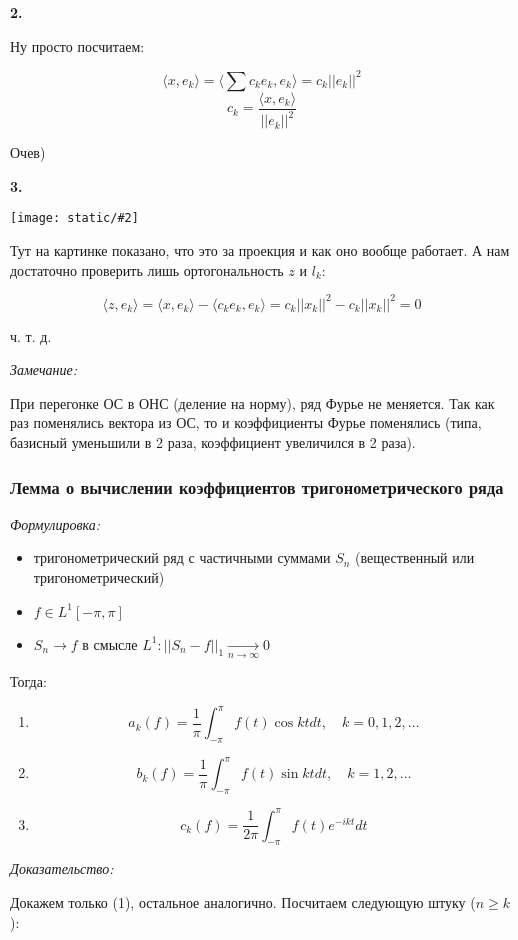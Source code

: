 \documentclass{article}
\def\images#1#2{\begin{center}\texttt{[image: static/\#2]}\end{center}}
\def\goesto#1{\underset{#1}{\longrightarrow}}
\def\toinf#1{\goesto{#1 \rightarrow \infty}}
\def\ntoinf{\toinf{n}}
\def\sk#1#2{\langle #1, #2 \rangle}
\begin{document}
\textbf{2.}

Ну просто посчитаем:

\[\sk{x}{e_k} = \sk{\sum c_k e_k}{e_k} = c_k ||e_k||^2\]
\[c_k = \frac{\sk{x}{e_k}}{||e_k||^2}\]

Очев)

\textbf{3.}

\images{0.3}{ort_sys.jpg}

Тут на картинке показано, что это за проекция и как оно вообще работает. А нам достаточно проверить лишь ортогональность $z$ и $l_k$:

\[\sk{z}{e_k} = \sk{x}{e_k} - \sk{c_ke_k}{e_k} = c_k ||x_k||^2 - c_k ||x_k||^2 = 0\]

ч. т. д. 

\textit{Замечание:}

При перегонке ОС в ОНС (деление на норму), ряд Фурье не меняется. Так как раз поменялись вектора из ОС, то и коэффициенты Фурье поменялись (типа, базисный уменьшили в 2 раза, коэффициент увеличился в 2 раза).

\subsubsection{Лемма о вычислении коэффициентов тригонометрического ряда}
\textit{Формулировка:}

\begin{itemize}
    \item тригонометрический ряд с частичными суммами $S_n$ (вещественный или тригонометрический)
    \item $f \in L^1[-\pi, \pi]$
    \item $S_n \rightarrow f$ в смысле $L^1: ||S_n - f||_1 \ntoinf 0$
\end{itemize}

Тогда:

\begin{enumerate}
    \item \[a_k(f) = \frac{1}{\pi} \int_{-\pi}^{\pi} f(t) \cos kt dt, \quad k = 0, 1, 2, \ldots\]
    \item \[b_k(f) = \frac{1}{\pi} \int_{-\pi}^{\pi} f(t) \sin kt dt, \quad k = 1, 2, \ldots\]
    \item \[c_k(f) = \frac{1}{2\pi} \int_{-\pi}^{\pi} f(t) e^{-ikt} dt\]
\end{enumerate}

\textit{Доказательство:}

Докажем только (1), остальное аналогично. Посчитаем следующую штуку ($n \ge k$):
\end{document}
